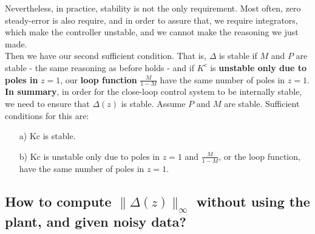 Nevertheless, in practice, stability is not the only requirement. Most often, zero steady-error is also require, and in order to assure that, we require integrators, which make the controller unstable, and we cannot make the reasoning we just made. \\

Then we have our second sufficient condition. That is, $\Delta$ is stable if $M$ and $P$ are stable - the same reasoning as before holds - and if $K^{c}$ is \textbf{unstable only due to poles in} $z = 1$, our \textbf{loop function} $\frac{M}{1-M}$ have the same number of poles in $z = 1$.\\

\textbf{In summary}, in order for the close-loop control system to be internally stable, we need to ensure that $\Delta (z)$ is stable.
Assume $P$ and $M$ are stable. Sufficient conditions for this are:
\begin{itemize}
\item[a)] Kc is stable.
\item[b)] Kc is unstable only due to poles in $z = 1$ and $\frac{M}{1-M}$, or the loop function, have the same number
of poles in $z = 1$.
\end{itemize}

\subsection{How to compute \(\|\Delta(z)\|_\infty\) without using the plant, and given noisy data?}

